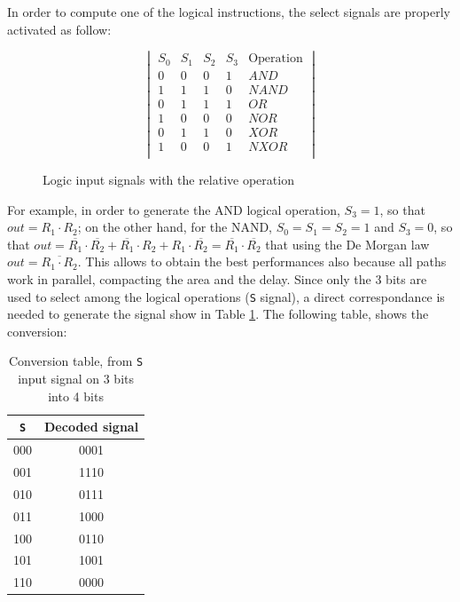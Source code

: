     In order to compute one of the logical instructions, the select signals are properly activated as follow:
    
    \begin{figure}[ht]
        \centering
    \[
    \begin{vmatrix}
        S_0 & S_1 & S_2 & S_3 & \text{Operation}\\
        0 & 0 & 0 & 1 & AND \\
        1 & 1 & 1 & 0 & NAND \\
        0 & 1 & 1 & 1 & OR \\
        1 & 0 & 0 & 0 & NOR \\
        0 & 1 & 1 & 0 & XOR \\
        1 & 0 & 0 & 1 & NXOR \\
    \end{vmatrix}
    \]
      \caption{Logic input signals with the relative operation}
      \label{tab:log_sign}
\end{figure}
    
    For example, in order to generate the AND logical operation, $S_3 = 1$, so that $out = R_1 \cdot R_2$; on the other hand, for the NAND,  $S_0 = S_1 = S_2 = 1$ and $S_3 = 0$, so that $out = \overline{R_1} \cdot \overline{R_2} + \overline{R_1} \cdot R_2 + R_1 \cdot \overline{R_2} = \overline{R_1} \cdot \overline{R_2}$ that using the De Morgan law $out = \overline{R_1 \cdot R_2}$.
    This allows to obtain the best performances also because all paths work in parallel, compacting the area and the delay.\newline\newline
    Since only the 3 bits are used to select among the logical operations (\texttt{S} signal), a direct correspondance is needed to generate the signal show in Table \ref{tab:log_sign}. The following table, shows the conversion:
    \begin{table}[H]
        \begin{center}
            \begin{tabular}{ c| c}
                \texttt{S} & Decoded signal \\
                \hline
                000 & 0001 \\
                001 & 1110 \\
                010 & 0111 \\
                011 & 1000 \\
                100 & 0110 \\ 
                101 & 1001 \\ 
                110 & 0000 \\ 
                
            \end{tabular}
            \caption{Conversion table, from \texttt{S} input signal on 3 bits into 4 bits}
        \end{center}
    \end{table}

